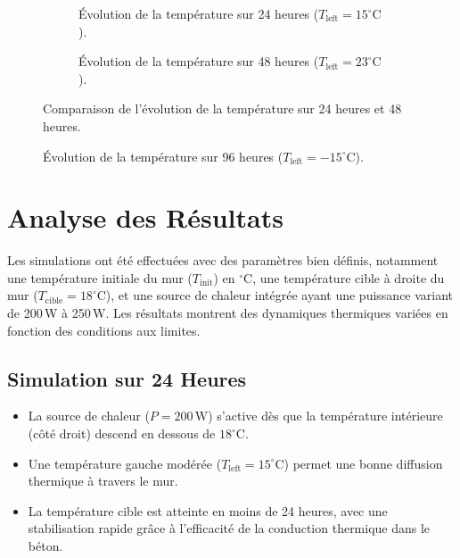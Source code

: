 \documentclass[a4paper,11pt]{article}
\begin{document}
\begin{figure}[htbp]
    \centering
    \begin{subfigure}[t]{0.49\textwidth}
        \centering
        \caption{Évolution de la température sur 24 heures (\(T_{\text{left}} = 15^\circ\mathrm{C}\)).}
        \label{fig:simulation_jalon3_24h}
    \end{subfigure}
    \hfill
    \begin{subfigure}[t]{0.49\textwidth}
        \centering
        \caption{Évolution de la température sur 48 heures (\(T_{\text{left}} = 23^\circ\mathrm{C}\)).}
        \label{fig:simulation_jalon3_48h}
    \end{subfigure}
    \caption{Comparaison de l'évolution de la température sur 24 heures et 48 heures.}
    \label{fig:simulation_comparison}
\end{figure}

\begin{figure}[t!]
    \centering
    \caption{Évolution de la température sur 96 heures (\(T_{\text{left}} = -15^\circ\mathrm{C}\)).}
    \label{fig:simulation_jalon3_96h}
\end{figure}

\section{Analyse des Résultats}

Les simulations ont été effectuées avec des paramètres bien définis, notamment une température initiale du mur (\(T_{\text{init}}\)) en \(^\circ\mathrm{C}\), une température cible à droite du mur (\(T_{\text{cible}} = 18^\circ\mathrm{C}\)), et une source de chaleur intégrée ayant une puissance variant de 200\,W à 250\,W. Les résultats montrent des dynamiques thermiques variées en fonction des conditions aux limites.

\subsection{Simulation sur 24 Heures}

\begin{itemize}
    \item La source de chaleur (\(P = 200\,\mathrm{W}\)) s'active dès que la température intérieure (côté droit) descend en dessous de \(18^\circ\mathrm{C}\).
    \item Une température gauche modérée (\(T_{\text{left}} = 15^\circ\mathrm{C}\)) permet une bonne diffusion thermique à travers le mur.
    \item La température cible est atteinte en moins de 24 heures, avec une stabilisation rapide grâce à l'efficacité de la conduction thermique dans le béton.
\end{itemize}
\end{document}

